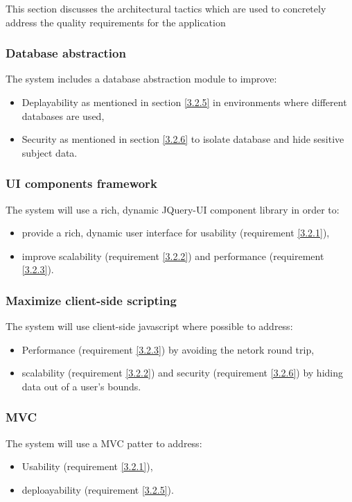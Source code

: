 This section discusses the architectural tactics which are used to concretely address the quality
requirements for the application

\subsubsection{Database abstraction}
The system includes a database abstraction module to improve:
\begin {itemize}
\item Deplayability as mentioned in section \ref {3.2.5} in environments where different databases are used,
\item Security as mentioned in section \ref {3.2.6} to isolate database and hide sesitive subject data.
\end {itemize}

\subsubsection{UI components framework}
The system will use a rich, dynamic JQuery-UI component library in order to:
\begin {itemize}
\item provide a rich, dynamic user interface for usability (requirement \ref {3.2.1}),
\item improve scalability (requirement \ref {3.2.2}) and performance (requirement \ref {3.2.3}).
\end{itemize}

\subsubsection{Maximize client-side scripting}
The system will use client-side javascript where possible to address:
\begin {itemize}
\item Performance (requirement \ref {3.2.3}) by avoiding the netork round trip,
\item scalability (requirement \ref {3.2.2}) and security (requirement \ref {3.2.6}) by hiding data out of a user's bounds.
\end{itemize}

\subsubsection{MVC}
The system will use a MVC patter to address:
\begin {itemize}
\item Usability (requirement \ref {3.2.1}),
\item deploayability (requirement \ref {3.2.5}).
\end{itemize}